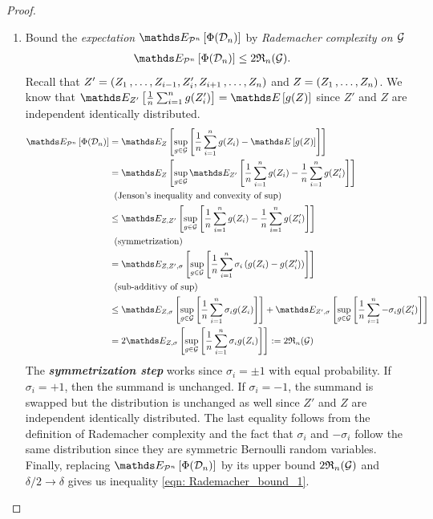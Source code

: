 \documentclass[11pt]{article}
\begin{document}
\begin{itemize}
\begin{proof}
\begin{enumerate}
\item Bound the \emph{expectation} $\E{\cP^{n}}{\Phi(\cD_n)}$ by \emph{Rademacher complexity on ${\mathcal G}$}
\begin{align*}
\E{\cP^{n}}{\Phi(\cD_n)} &\le 2   \frR_{n}(\cG).
\end{align*} Recall that $Z'  = (Z_1 \,{,}\ldots{,}\, Z_{i-1}, Z_i', Z_{i+1} \,{,}\ldots{,}\, Z_n)$ and $Z = (Z_1 \,{,}\ldots{,}\, Z_n)$. We know that $\E{Z'}{\frac{1}{n}\sum_{i=1}^{n}g(Z_i')} =  \E{}{g(Z)}$ since $Z'$ and $Z$ are independent identically distributed.
\begin{align}
\E{\cP^{n}}{\Phi(\cD_n)} &= \E{Z}{\sup_{g \in \cG}\brac{\frac{1}{n}\sum_{i=1}^{n}g(Z_i) - \E{}{g(Z)}}} \nonumber\\
&= \E{Z}{\sup_{g \in \cG}\E{Z'}{ \frac{1}{n}\sum_{i=1}^{n}g(Z_i) - \frac{1}{n}\sum_{i=1}^{n}g(Z_i') }} \nonumber\\
& \;\;(\text{Jenson's inequality and convexity of $\sup$}) \nonumber\\
&\le \E{Z, Z'}{\sup_{g \in \cG}\brac{ \frac{1}{n}\sum_{i=1}^{n}g(Z_i) - \frac{1}{n}\sum_{i=1}^{n}g(Z_i') }} \nonumber\\
& \;\; (\text{symmetrization}) \nonumber\\
& =\E{Z, Z', \sigma}{\sup_{g \in \cG}\brac{\frac{1}{n}\sum_{i=1}^{n}\sigma_i\paren{g(Z_i) - g(Z_i')}}} \nonumber\\
& \;\; (\text{sub-additivy of $\sup$}) \nonumber\\
&\le \E{Z, \sigma}{\sup_{g \in \cG}\brac{\frac{1}{n}\sum_{i=1}^{n}\sigma_i g(Z_i) }}+ \E{Z', \sigma}{\sup_{g \in \cG}\brac{\frac{1}{n}\sum_{i=1}^{n}-\sigma_i g(Z_i')}} \nonumber\\
&= 2 \E{Z, \sigma}{\sup_{g \in \cG}\brac{\frac{1}{n}\sum_{i=1}^{n}\sigma_i g(Z_i) }} := 2\frR_n(\cG) \label{pf: rad_comp_bound_2}
\end{align}
The \emph{\textbf{symmetrization step}} works since $\sigma_i = \pm 1$ with equal probability. If $\sigma_i = +1$, then the summand is unchanged. If $\sigma_i = -1$, the summand is swapped but the distribution  is unchanged as well since  $Z'$ and $Z$ are independent identically distributed.
The last equality follows from the definition of Rademacher complexity and the fact that $\sigma_i$ and $-\sigma_i$ follow the same distribution since they are symmetric Bernoulli random variables. Finally, replacing $\E{\cP^{n}}{\Phi(\cD_n)}$ by its upper bound $2{\mathfrak R}_n({\mathcal G})$ and $\delta/2 \to \delta$ gives us  inequality \eqref{eqn: Rademacher_bound_1}.


\end{enumerate}
\end{proof}
\end{itemize}
\end{document}
